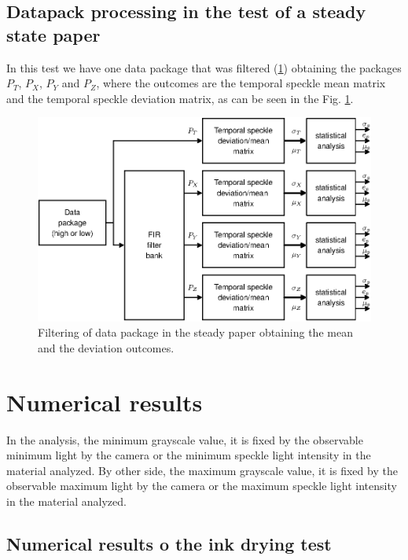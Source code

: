 \documentclass[review]{elsarticle}
\begin{document}
\subsection{Datapack processing in the test of a steady state paper}
\label{subsec:numprocink}

In this test we have one data package that was filtered (\ref{fig:filtering2}) obtaining the packages $P_T$, $P_X$, $P_Y$ and $P_Z$, where the outcomes are the temporal speckle mean matrix and the 
temporal speckle deviation matrix, as can be seen in the Fig. \ref{fig:filtering2}.

\begin{figure}[h!]
\centering
\includegraphics[width=0.65\columnwidth]{filtering2.eps}
\caption{Filtering of data package in the steady paper obtaining the mean and the deviation outcomes.}
\label{fig:filtering2}
\end{figure}




\section{Numerical results} 
\label{sec:numerical}


In the analysis, the minimum grayscale value, 
it is fixed by the observable minimum light by the camera or the minimum speckle light intensity in the material analyzed.
By other side, the maximum grayscale value, 
it is fixed by the observable maximum light by the camera or the maximum speckle light intensity in the material analyzed.

\subsection{Numerical results o the ink drying test} 
\label{subsec:numericalink}
\end{document}

